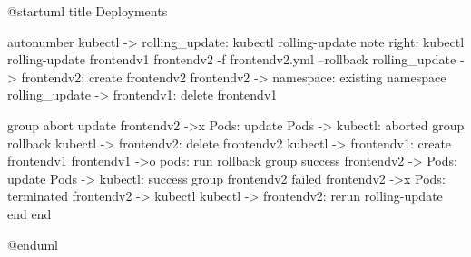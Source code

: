 @startuml
title Deployments

autonumber
kubectl -> rolling_update: kubectl rolling-update
note right: kubectl rolling-update frontendv1 frontendv2 -f frontendv2.yml --rollback
rolling_update -> frontendv2: create frontendv2
frontendv2 -> namespace: existing namespace
rolling_update -> frontendv1: delete frontendv1

group abort update
  frontendv2 ->x Pods: update
  Pods -> kubectl: aborted
  group rollback
    kubectl -> frontendv2: delete frontendv2
    kubectl -> frontendv1: create frontendv1
    frontendv1 ->o pods: run rollback
  group success
      frontendv2 -> Pods: update
      Pods -> kubectl: success
      group frontendv2 failed
        frontendv2 ->x Pods: terminated
        frontendv2 -> kubectl
        kubectl -> frontendv2: rerun rolling-update
        end
    end

@enduml
